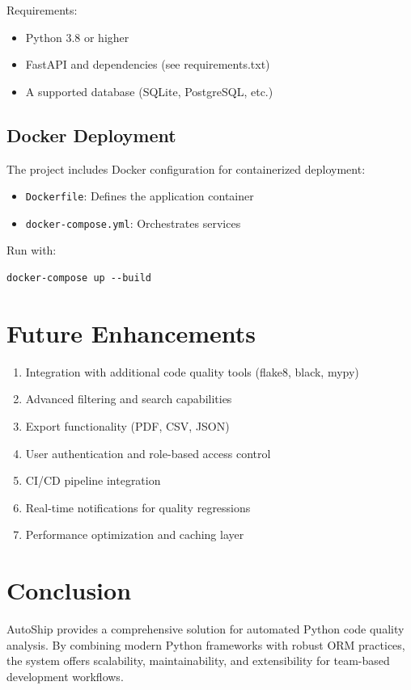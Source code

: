 \documentclass[12pt]{article}
\begin{document}
Requirements:
\begin{itemize}
    \item Python 3.8 or higher
    \item FastAPI and dependencies (see requirements.txt)
    \item A supported database (SQLite, PostgreSQL, etc.)
\end{itemize}

\subsection{Docker Deployment}

The project includes Docker configuration for containerized deployment:
\begin{itemize}
    \item \texttt{Dockerfile}: Defines the application container
    \item \texttt{docker-compose.yml}: Orchestrates services
\end{itemize}

Run with:
\begin{lstlisting}
docker-compose up --build
\end{lstlisting}

\section{Future Enhancements}

\begin{enumerate}
    \item Integration with additional code quality tools (flake8, black, mypy)
    \item Advanced filtering and search capabilities
    \item Export functionality (PDF, CSV, JSON)
    \item User authentication and role-based access control
    \item CI/CD pipeline integration
    \item Real-time notifications for quality regressions
    \item Performance optimization and caching layer
\end{enumerate}

\section{Conclusion}

AutoShip provides a comprehensive solution for automated Python code quality analysis. By combining modern Python frameworks with robust ORM practices, the system offers scalability, maintainability, and extensibility for team-based development workflows.
\end{document}
